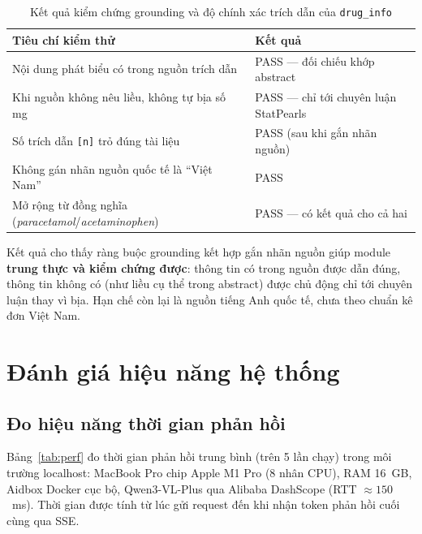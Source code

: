 \documentclass[a4paper,13pt,3p,oneside]{report}
\theoremstyle{definition}
\theoremstyle{remark}
\theoremstyle{definition}
\begin{document}
\begin{table}[H]
\centering
\begin{tabular}{|p{6.5cm}|p{6.0cm}|}
\hline
\textbf{Tiêu chí kiểm thử} & \textbf{Kết quả} \\
\hline
Nội dung phát biểu có trong nguồn trích dẫn & PASS --- đối chiếu khớp abstract \\
\hline
Khi nguồn không nêu liều, không tự bịa số mg & PASS --- chỉ tới chuyên luận StatPearls \\
\hline
Số trích dẫn \texttt{[n]} trỏ đúng tài liệu & PASS (sau khi gắn nhãn nguồn) \\
\hline
Không gán nhãn nguồn quốc tế là ``Việt Nam'' & PASS \\
\hline
Mở rộng từ đồng nghĩa (\textit{paracetamol}/\textit{acetaminophen}) & PASS --- có kết quả cho cả hai \\
\hline
\end{tabular}
\caption{Kết quả kiểm chứng grounding và độ chính xác trích dẫn của \texttt{drug\_info}}
\label{tab:druginfo-test}
\end{table}

Kết quả cho thấy ràng buộc grounding kết hợp gắn nhãn nguồn giúp module \textbf{trung thực và kiểm chứng được}: thông tin có trong nguồn được dẫn đúng, thông tin không có (như liều cụ thể trong abstract) được chủ động chỉ tới chuyên luận thay vì bịa. Hạn chế còn lại là nguồn tiếng Anh quốc tế, chưa theo chuẩn kê đơn Việt Nam.

\section{Đánh giá hiệu năng hệ thống}

\subsection{Đo hiệu năng thời gian phản hồi}

Bảng~\ref{tab:perf} đo thời gian phản hồi trung bình (trên 5 lần chạy) trong môi trường localhost: MacBook Pro chip Apple M1 Pro (8 nhân CPU), RAM 16~GB, Aidbox Docker cục bộ, Qwen3-VL-Plus qua Alibaba DashScope (RTT $\approx 150$~ms). Thời gian được tính từ lúc gửi request đến khi nhận token phản hồi cuối cùng qua SSE.
\end{document}
